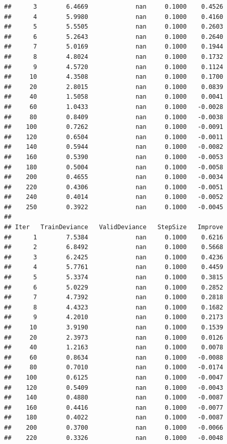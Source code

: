 \documentclass[]{book}
\begin{document}
\begin{verbatim}
##      3        6.4669             nan     0.1000    0.4526
##      4        5.9980             nan     0.1000    0.4160
##      5        5.5505             nan     0.1000    0.2603
##      6        5.2643             nan     0.1000    0.2640
##      7        5.0169             nan     0.1000    0.1944
##      8        4.8024             nan     0.1000    0.1732
##      9        4.5720             nan     0.1000    0.1124
##     10        4.3508             nan     0.1000    0.1700
##     20        2.8015             nan     0.1000    0.0839
##     40        1.5058             nan     0.1000    0.0041
##     60        1.0433             nan     0.1000   -0.0028
##     80        0.8409             nan     0.1000   -0.0038
##    100        0.7262             nan     0.1000   -0.0091
##    120        0.6504             nan     0.1000   -0.0011
##    140        0.5944             nan     0.1000   -0.0082
##    160        0.5390             nan     0.1000   -0.0053
##    180        0.5004             nan     0.1000   -0.0058
##    200        0.4655             nan     0.1000   -0.0034
##    220        0.4306             nan     0.1000   -0.0051
##    240        0.4014             nan     0.1000   -0.0052
##    250        0.3922             nan     0.1000   -0.0045
## 
## Iter   TrainDeviance   ValidDeviance   StepSize   Improve
##      1        7.5384             nan     0.1000    0.6216
##      2        6.8492             nan     0.1000    0.5668
##      3        6.2425             nan     0.1000    0.4236
##      4        5.7761             nan     0.1000    0.4459
##      5        5.3374             nan     0.1000    0.3815
##      6        5.0229             nan     0.1000    0.2852
##      7        4.7392             nan     0.1000    0.2818
##      8        4.4323             nan     0.1000    0.1682
##      9        4.2010             nan     0.1000    0.2173
##     10        3.9190             nan     0.1000    0.1539
##     20        2.3973             nan     0.1000    0.0126
##     40        1.2163             nan     0.1000    0.0078
##     60        0.8634             nan     0.1000   -0.0088
##     80        0.7010             nan     0.1000   -0.0174
##    100        0.6125             nan     0.1000   -0.0047
##    120        0.5409             nan     0.1000   -0.0043
##    140        0.4880             nan     0.1000   -0.0087
##    160        0.4416             nan     0.1000   -0.0077
##    180        0.4022             nan     0.1000   -0.0087
##    200        0.3700             nan     0.1000   -0.0066
##    220        0.3326             nan     0.1000   -0.0048

\end{verbatim}
\end{document}
